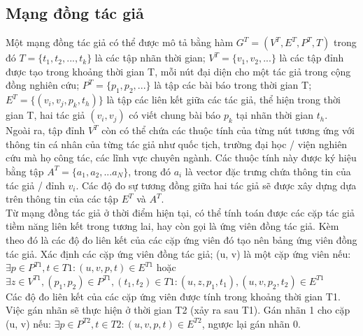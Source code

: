 \documentclass{article}
\begin{document}

\subsection{Mạng đồng tác giả}

Một mạng đồng tác giả có thể được mô tả bằng hàm $G^T=(V^T, E^T, P^T, T)$ trong đó $T=\{t_1, t_2, ..., t_k\}$ là các tập nhãn thời gian; $V^T=\{v_1, v_2, ...\}$ là các tập đỉnh được tạo trong khoảng thời gian T, mỗi nút đại diện cho một tác giả trong cộng đồng nghiên cứu; $P^T=\{p_1, p_2, ...\}$ là tập các bài báo trong thời gian T; $E^T=\{(v_i, v_j, p_k, t_h)\}$ là tập các liên kết giữa các tác giả, thể hiện trong thời gian T, hai tác giả $(v_i, v_j)$ có viết chung bài báo $p_k$ tại nhãn thời gian $t_h$. \\

Ngoài ra, tập đỉnh $V^T$ còn có thể chứa các thuộc tính của từng nút tương ứng với thông tin cá nhân của từng tác giả như quốc tịch, trường đại học / viện nghiên cứu mà họ công tác, các lĩnh vực chuyên ngành. Các thuộc tính này được ký hiệu bằng tập $A^T=\{a_1, a_2, ... a_N\}$, trong đó $a_i$ là vector đặc trưng chứa thông tin của tác giả / đỉnh $v_i$. Các độ đo sự tương đồng giữa hai tác giả sẽ được xây dựng dựa trên thông tin của các tập $E^T$ và $A^T$. \\

Từ mạng đồng tác giả ở thời điểm hiện tại, có thể tính toán được các cặp tác giả tiềm năng liên kết trong tương lai, hay còn gọi là ứng viên đồng tác giả. Kèm theo đó là các độ đo liên kết của các cặp ứng viên đó tạo nên bảng ứng viên đồng tác giả. Xác định các cặp ứng viên đồng tác giả; (u, v) là một cặp ứng viên nếu:
$\exists p \in P^{T1}, t \in T1: (u, v, p, t) \in E^{T1}$ hoặc $\exists z \in V^{T1}, (p_1, p_2) \in P^{T1}, (t_1, t_2) \in T1: (u, z, p_1, t_1), (u, v, p_2, t_2) \in E^{T1}$ \\

Các độ đo liên kết của các cặp ứng viên được tính trong khoảng thời gian T1. Việc gán nhãn sẽ thực hiện ở thời gian T2 (xảy ra sau T1). Gán nhãn 1 cho cặp (u, v) nếu: $\exists p \in P^{T2}, t \in T2: (u,v, p, t) \in E^{T2}$, ngược lại gán nhãn 0. \\
\end{document}
